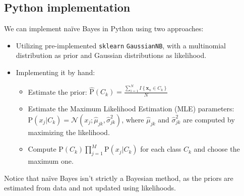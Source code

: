 \subsection{Python implementation}
We can implement naïve Bayes in Python using two approaches:
\begin{itemize}
    \item Utilizing pre-implemented \texttt{sklearn} \texttt{GaussianNB}, with a multinomial distribution as prior and Gaussian distributions as likelihood.
    \item Implementing it by hand:
        \begin{itemize}
            \item Estimate the prior: $\hat{\text{P}}(C_k)=\frac{\sum_{i=1}^{N}I\left\{ \textbf{x}_n\in C_k \right\}}{N}$
            \item Estimate the Maximum Likelihood Estimation (MLE) parameters: $\text{P}(x_j|C_k)=\mathcal{N}(x_j;\hat{\mu}_{jk},\hat{\sigma}_{jk}^2)$, where $\hat{\mu}_{jk}$ and $\hat{\sigma}_{jk}^2$ are computed by maximizing the likelihood.
            \item Compute $\text{P}(C_k)\prod_{j=1}^{M}\text{P}(x_j|C_k)$ for each class $C_k$ and choose the maximum one. 
        \end{itemize}
\end{itemize}
Notice that naïve Bayes isn't strictly a Bayesian method, as the priors are estimated from data and not updated using likelihoods.